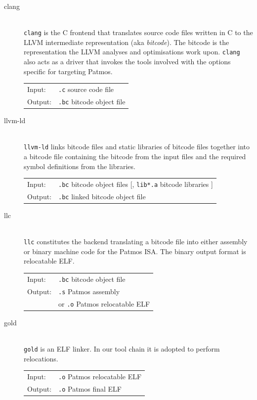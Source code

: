 \begin{description}
\item[clang] \hfill\\
  \texttt{clang} is the C frontend that translates source code files written in C
  to the LLVM intermediate representation (aka \emph{bitcode}). The bitcode
  is the representation the LLVM analyses and optimisations work upon.
  \texttt{clang} also acts as a driver that invokes the tools involved with the
  options specific for targeting Patmos.

  \begin{tabular}{ll}
  Input:  & \texttt{.c} source code file \\
  Output: & \texttt{.bc} bitcode object file
  \end{tabular}

\item[llvm-ld] \hfill\\
  \texttt{llvm-ld} links bitcode files and static libraries of bitcode files
  together into a bitcode file containing the bitcode from the input files
  and the required symbol definitions from the libraries.

  \begin{tabular}{ll}
  Input:  & \texttt{.bc} bitcode object files [, \texttt{lib*.a} bitcode
            libraries ]\\
  Output: & \texttt{.bc} linked bitcode object file
  \end{tabular}

\item[llc] \hfill\\
  \texttt{llc} constitutes the backend translating a bitcode file into either
  assembly or binary machine code for the Patmos ISA.
  The binary output format is relocatable ELF.

  \begin{tabular}{ll}
  Input:  & \texttt{.bc} bitcode object file \\
  Output: & \texttt{.s} Patmos assembly \\
          & or \texttt{.o} Patmos relocatable ELF
  \end{tabular}

\item[gold] \hfill\\
  \texttt{gold} is an ELF linker.
  In our tool chain it is adopted to perform relocations.

  \begin{tabular}{ll}
  Input:  & \texttt{.o} Patmos relocatable ELF \\
  Output: & \texttt{.o} Patmos final ELF
  \end{tabular}


\end{description}
